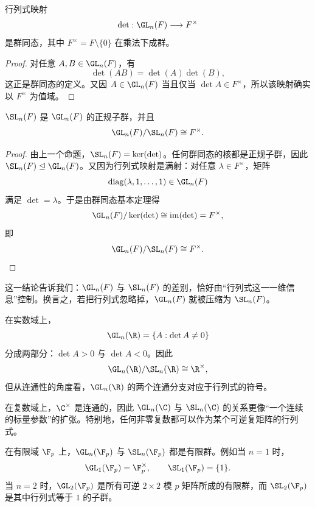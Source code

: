 \begin{proposition}
行列式映射
\[
\det:\GL_n(F)\longrightarrow F^\times
\]
是群同态，其中 $F^\times=F\setminus\{0\}$ 在乘法下成群。
\end{proposition}

\begin{proof}
对任意 $A,B\in \GL_n(F)$，有
\[
\det(AB)=\det(A)\det(B),
\]
这正是群同态的定义。又因 $A\in \GL_n(F)$ 当且仅当 $\det A\in F^\times$，所以该映射确实以 $F^\times$ 为值域。
\end{proof}

\begin{theorem}
$\SL_n(F)$ 是 $\GL_n(F)$ 的正规子群，并且
\[
\GL_n(F)/\SL_n(F)\cong F^\times.
\]
\end{theorem}

\begin{proof}
由上一个命题，$\SL_n(F)=\ker(\det)$。任何群同态的核都是正规子群，因此 $\SL_n(F)\trianglelefteq \GL_n(F)$。又因为行列式映射是满射：对任意 $\lambda\in F^\times$，矩阵
\[
\operatorname{diag}(\lambda,1,\dots,1)\in \GL_n(F)
\]
满足 $\det=\lambda$。于是由群同态基本定理得
\[
\GL_n(F)/\ker(\det)\cong \operatorname{im}(\det)=F^\times,
\]
即
\[
\GL_n(F)/\SL_n(F)\cong F^\times.
\]
\end{proof}

\begin{remark}
这一结论告诉我们：$\GL_n(F)$ 与 $\SL_n(F)$ 的差别，恰好由“行列式这一一维信息”控制。换言之，若把行列式忽略掉，$\GL_n(F)$ 就被压缩为 $\SL_n(F)$。
\end{remark}

\begin{example}
在实数域上，
\[
\GL_n(\R)=\{A:\det A\ne 0\}
\]
分成两部分：$\det A>0$ 与 $\det A<0$。因此
\[
\GL_n(\R)/\SL_n(\R)\cong \R^\times,
\]
但从连通性的角度看，$\GL_n(\R)$ 的两个连通分支对应于行列式的符号。
\end{example}

\begin{example}
在复数域上，$\C^\times$ 是连通的，因此 $\GL_n(\C)$ 与 $\SL_n(\C)$ 的关系更像“一个连续的标量参数”的扩张。特别地，任何非零复数都可以作为某个可逆复矩阵的行列式。
\end{example}

\begin{example}
在有限域 $\F_p$ 上，$\GL_n(\F_p)$ 与 $\SL_n(\F_p)$ 都是有限群。例如当 $n=1$ 时，
\[
\GL_1(\F_p)=\F_p^\times,
\qquad
\SL_1(\F_p)=\{1\}.
\]
当 $n=2$ 时，$\GL_2(\F_p)$ 是所有可逆 $2\times 2$ 模 $p$ 矩阵所成的有限群，而 $\SL_2(\F_p)$ 是其中行列式等于 $1$ 的子群。
\end{example}

